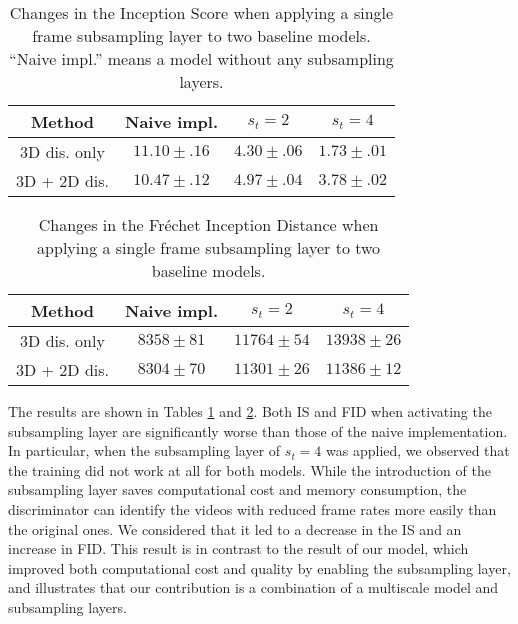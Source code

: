 \documentclass[twocolumn]{svjour3}
\begin{document}
\begin{table}[t]
\centering
{\renewcommand{\arraystretch}{1.2}
\begin{tabular}{c|ccc}
Method & Naive impl. & $s_t = 2$ & $s_t = 4$ \\ \hline \hline
3D dis. only & $11.10 \pm .16$ & $4.30 \pm .06$ & $1.73 \pm .01$ \\
3D + 2D dis. & $10.47 \pm .12$ & $4.97 \pm .04$ & $3.78 \pm .02$ \\ \hline
\end{tabular}
}
\caption{Changes in the Inception Score when applying a single frame subsampling layer to two baseline models. ``Naive impl.'' means a model without any subsampling layers.}
\label{table:frame_is}
\end{table}
\begin{table}[t]
\centering
{\renewcommand{\arraystretch}{1.2}
\begin{tabular}{c|ccc}
Method & Naive impl. & $s_t = 2$ & $s_t = 4$ \\ \hline \hline
3D dis. only & $8358 \pm 81$ & $11764 \pm 54$ & $13938 \pm 26$ \\
3D + 2D dis. & $8304 \pm 70$ & $11301 \pm 26$ & $11386 \pm 12$ \\ \hline
\end{tabular}
}
\caption{Changes in the Fr\'echet Inception Distance when applying a single frame subsampling layer to two baseline models.}
\label{table:frame_fid}
\end{table}










The results are shown in Tables \ref{table:frame_is} and \ref{table:frame_fid}.
Both IS and FID when activating the subsampling layer are
significantly worse than those of the naive implementation.
In particular, when the subsampling layer of $s_t=4$ was applied,
we observed that the training did not work at all for both models.
While the introduction of the subsampling layer saves computational cost and memory consumption,
the discriminator can identify the videos with reduced frame rates more easily than the original ones.
We considered that it led to a decrease in the IS and an increase in FID.
This result is in contrast to the result of our model,
which improved both computational cost and quality by enabling the subsampling layer,
and illustrates that our contribution is a combination of a multiscale model and subsampling layers.
\end{document}
